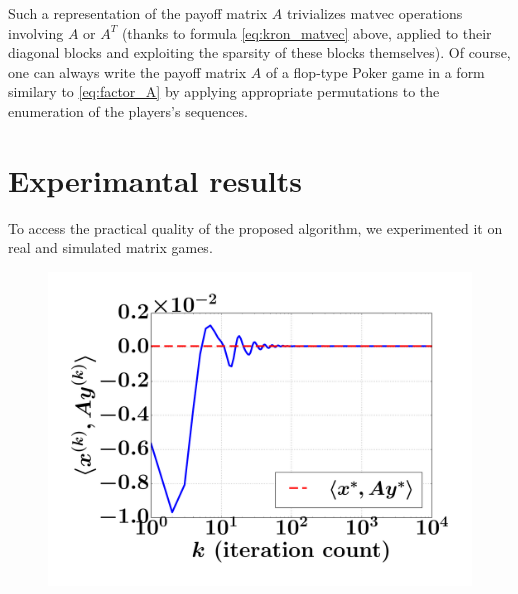 \documentclass[envcountsame]{llncs} %
\begin{document}
Such a representation of the payoff matrix $A$ trivializes matvec operations involving $A$ or $A^T$ (thanks to formula \eqref{eq:kron_matvec} above, applied to their diagonal blocks and exploiting the sparsity of these blocks themselves). Of course, one can always write the payoff matrix $A$ of a flop-type Poker game in a form similary to \eqref{eq:factor_A} by applying appropriate permutations to the enumeration of the players's sequences.

\section{Experimantal results}
\label{sec:results}
To access the practical quality of the proposed algorithm, we
experimented it on real and simulated matrix games.

\begin{figure}[!htpb]
  \hspace{-2em}
  \hspace{-2em}
  \vspace{-1em}
  \hspace{-1em}
  \includegraphics[width=.34\linewidth]{simplex_NE.pdf}

\end{figure}
\end{document}

